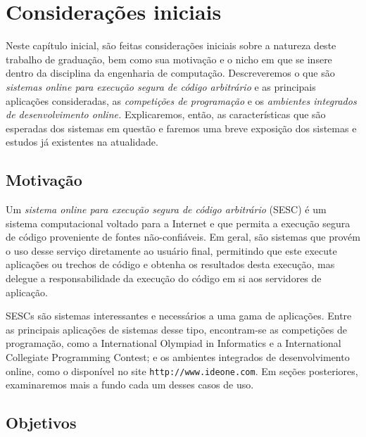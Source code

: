 \documentclass[ruledheader, 12pt]{abnt}
\begin{document}
\tableofcontents

\listoffigures

\listoftables

\renewcommand\nomname{Lista de Abreviaturas e Siglas}
\printnomenclature

\chapter{Considerações iniciais}

Neste capítulo inicial, são feitas considerações iniciais sobre a natureza deste trabalho de graduação, bem como sua motivação e o nicho em que se insere dentro da disciplina da engenharia de computação. Descreveremos o que são \emph{sistemas online para execução segura de código arbitrário} e as principais aplicações consideradas, as \emph{competições de programação} e os \emph{ambientes integrados de desenvolvimento online.} Explicaremos, então, as características que são esperadas dos sistemas em questão e faremos uma breve exposição dos sistemas e estudos já existentes na atualidade.

\section{Motivação}


Um \emph{sistema online para execução segura de código arbitrário} (SESC) é um sistema computacional voltado para a Internet e que permita a execução segura de código proveniente de fontes não-confiáveis. Em geral, são sistemas que provém o uso desse serviço diretamente ao usuário final, permitindo que este execute aplicações ou trechos de código e obtenha os resultados desta execução, mas delegue a responsabilidade da execução do código em si aos servidores de aplicação.

SESCs são sistemas interessantes e necessários a uma gama de aplicações. Entre as principais aplicações de sistemas desse tipo, encontram-se as competições de programação, como a International Olympiad in Informatics e a International Collegiate Programming Contest; e os ambientes integrados de desenvolvimento online, como o disponível no site \verb|http://www.ideone.com|. Em seções posteriores, examinaremos mais a fundo cada um desses casos de uso.

\section{Objetivos}
\end{document}
